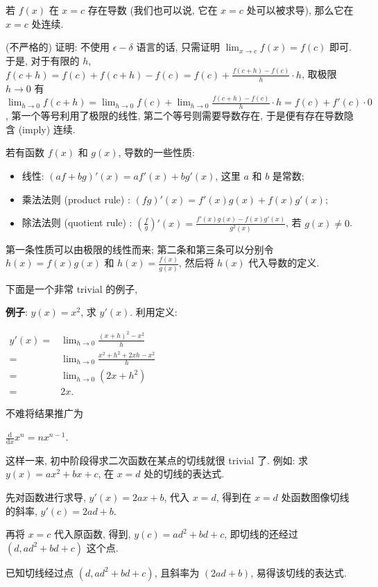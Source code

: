 \begin{tcolorbox}[size=fbox, breakable, enhanced jigsaw, title={导数 (derivative)}]
\begin{tcolorbox}[size=fbox, breakable, enhanced jigsaw, title={定理}]
若 $f(x)$ 在 $x=c$ 存在导数 (我们也可以说, 它在
$x=c$ 处可以被求导), 那么它在 $x=c$ 处连续.
\end{tcolorbox}

(不严格的) {\kaishu 证明}: 不使用 $\epsilon - \delta$ 语言的话,
只需证明 $\lim_{x\rightarrow c}f(x)=f(c)$ 即可. 于是, 对于有限的
$h$, $f(c+h)=f(c)+f(c+h)-f(c)=f(c)+\frac{f(c+h)-f(c)}{h}\cdot h$,
取极限 $h\rightarrow0$ 有
$\lim_{h\rightarrow0}f(c+h)=\lim_{h\rightarrow0}f(c)+\lim_{h\rightarrow0}\frac{f(c+h)-f(c)}{h}\cdot h=f(c)+f'(c)\cdot 0$,
第一个等号利用了极限的线性, 第二个等号则需要导数存在,
于是便有存在导数隐含 (imply) 连续.

若有函数 $f(x)$ 和 $g(x)$, 导数的一些性质:

\begin{itemize}

\item
  线性: $(af+bg)'(x)=af'(x)+bg'(x)$, 这里 $a$ 和 $b$ 是常数;
\item
  乘法法则 (product rule) : $(fg)'(x)=f'(x)g(x)+f(x)g'(x)$;
\item
  除法法则 (quotient rule) : $\left(\frac{f}{g}\right)'(x)=\frac{f'(x)g(x)-f(x)g'(x)}{g^2(x)}$,
  若 $g(x)\neq 0$.
\end{itemize}

第一条性质可以由极限的线性而来; 第二条和第三条可以分别令
$h(x)=f(x)g(x)$ 和 $h(x)=\frac{f(x)}{g(x)}$, 然后将 $h(x)$
代入导数的定义.

下面是一个非常 trivial 的例子,

\begin{newquote}
\textbf{例子}: $y(x)=x^2$, 求 $y'(x)$. 利用定义:

$\begin{aligned}y'(x)=&\lim_{h\rightarrow0}\frac{(x+h)^2-x^2}{h}\\=&\lim_{h\rightarrow0}\frac{x^2+h^2+2xh-x^2}{h}\\=&\lim_{h\rightarrow0}(2x+h^2)\\=&2x.\end{aligned}$
\end{newquote}

不难将结果推广为

$\boxed{\frac{\mathrm{d}}{\mathrm{d}x}x^n=nx^{n-1}}.$

\begin{newquote}
这样一来, 初中阶段得求二次函数在某点的切线就很 trivial 了. 例如: 求 $y (x)=ax^2+bx+c$, 在 $x=d$ 处的切线的表达式.

先对函数进行求导, $y'(x)=2ax+b$, 代入 $x=d$, 得到在 $x=d$ 处函数图像切线的斜率, $y'(c)=2ad+b$.

再将 $x=c$ 代入原函数, 得到, $y(c)=ad^2+bd+c$, 即切线的还经过 $(d, ad^2+bd+c)$ 这个点.

已知切线经过点 $(d, ad^2+bd+c)$, 且斜率为 $(2ad+b)$, 易得该切线的表达式.
\end{newquote}

\end{tcolorbox}
